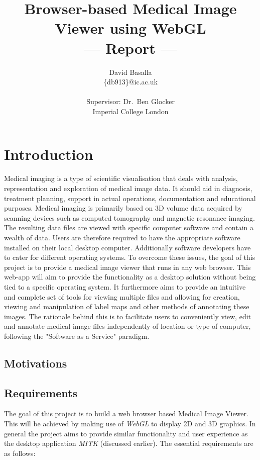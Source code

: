 \documentclass[a4paper,11pt,titlepage]{article}
\title{Browser-based Medical Image Viewer using WebGL \\\Large{--- Report ---}}
\author{David Basalla\\
  \{db913\}@ic.ac.uk\\ \\
  \small{Supervisor: Dr.\ Ben Glocker}\\
  \small{Imperial College London}
}
\begin{document}
\maketitle



\section{Introduction}

Medical imaging is a type of scientific visualisation that deals with analysis, representation and exploration of medical image data. It should aid in diagnosis, treatment planning, support in actual operations, documentation and educational purposes. Medical imaging is primarily based on 3D volume data acquired by scanning devices such as computed tomography and magnetic resonance imaging. The resulting data files are viewed with specific computer software and contain a wealth of data. Users are therefore required to have the appropriate software installed on their local desktop computer. Additionally software developers have to cater for different operating systems. To overcome these issues, the goal of this project is to provide a medical image viewer that runs in any web browser. This web-app will aim to provide the functionality as a desktop solution without being tied to a specific operating system. It furthermore aims to provide an intuitive and complete set of tools for viewing multiple files and allowing for creation, viewing and manipulation of label maps and other methods of annotating these images. The rationale behind this is to facilitate users to conveniently view, edit and annotate medical image files independently of location or type of computer, following the "Software as a Service" paradigm.

\subsection{Motivations}

\subsection{Requirements}


The goal of this project is to build a web browser based Medical Image Viewer. This will be achieved by making use of \textit{WebGL} to display 2D and 3D graphics. In general the project aims to provide similar functionality and user experience as the desktop application \textit{MITK} (discussed earlier). The essential requirements are as follows:
\end{document}
